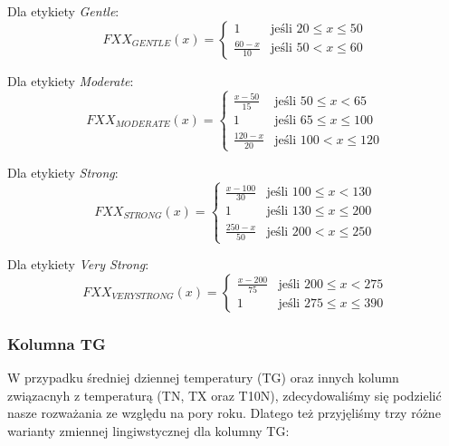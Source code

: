 \documentclass{classrep}
\begin{document}
Dla etykiety \textit{Gentle}:
\begin{equation}
{FXX}_{GENTLE}(x)= \left\{ \begin{array}{ll}
1 			& \textrm{jeśli $20 \leq x \leq 50$} \\
\frac{60-x}{10} 	& \textrm{jeśli $50 < x \leq 60$}
\end{array} \right.
\end{equation}

Dla etykiety \textit{Moderate}:
\begin{equation}
{FXX}_{MODERATE}(x)= \left\{ \begin{array}{ll}
\frac{x-50}{15} 	& \textrm{jeśli $50 \leq x < 65$} \\
1 			& \textrm{jeśli $65 \leq x \leq 100$} \\
\frac{120-x}{20} 	& \textrm{jeśli $100 < x \leq 120$}
\end{array} \right.
\end{equation}

Dla etykiety \textit{Strong}:
\begin{equation}
{FXX}_{STRONG}(x)= \left\{ \begin{array}{ll}
\frac{x-100}{30} 	& \textrm{jeśli $100 \leq x < 130$} \\
1 			& \textrm{jeśli $130 \leq x \leq 200$} \\
\frac{250-x}{50} 	& \textrm{jeśli $200 < x \leq 250$}
\end{array} \right.
\end{equation}

Dla etykiety \textit{Very Strong}:
\begin{equation}
{FXX}_{VERYSTRONG}(x)= \left\{ \begin{array}{ll}
\frac{x-200}{75} 	 & \textrm{jeśli $200 \leq x < 275$} \\
1 			 & \textrm{jeśli $275 \leq x \leq 390$}
\end{array} \right.
\end{equation}

\clearpage



\subsubsection{Kolumna TG}
W przypadku średniej dziennej temperatury (TG) oraz innych kolumn związacnyh z temperaturą (TN, TX oraz T10N), zdecydowaliśmy się podzielić nasze rozważania ze względu na pory roku. Dlatego też przyjęliśmy trzy różne warianty zmiennej lingiwstycznej dla kolumny TG:
\end{document}
